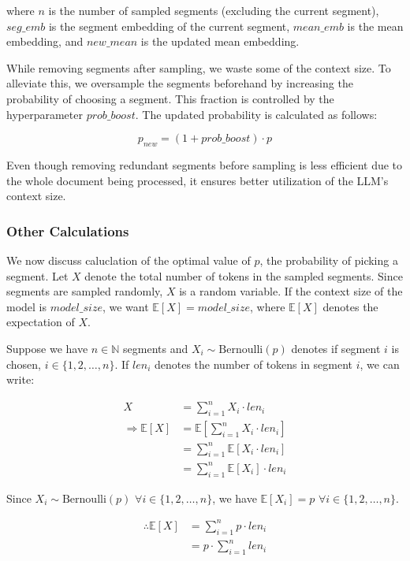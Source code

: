 \noindent where $n$ is the number of sampled segments (excluding the current segment), $seg\_emb$ is the segment embedding of the current segment, $mean\_emb$ is the mean embedding, and $new\_mean$ is the updated mean embedding.

While removing segments after sampling, we waste some of the context size.
To alleviate this, we oversample the segments beforehand by increasing the probability of choosing a segment.
This fraction is controlled by the hyperparameter $prob\_boost$.
The updated probability is calculated as follows:

\[ p_{new} = (1 + prob\_boost) \cdot p \]

Even though removing redundant segments before sampling is less efficient due to the whole document being processed, it ensures better utilization of the LLM's context size.

\subsubsection*{Other Calculations}

We now discuss caluclation of the optimal value of $p$, the probability of picking a segment.
Let $X$ denote the total number of tokens in the sampled segments.
Since segments are sampled randomly, $X$ is a random variable.
If the context size of the model is $model\_size$, we want $\mathbb{E}[X] = model\_size$, where $\mathbb{E}[X]$ denotes the expectation of $X$.

Suppose we have $n \in \mathbb{N}$ segments and $X_i \sim \mathrm{Bernoulli}(p)$ denotes if segment $i$ is chosen, $i \in \{1, 2, \dots, n\}$.
If $len_i$ denotes the number of tokens in segment $i$, we can write:

\begin{align*}
  X &= \sum_{i = 1}^{n} X_i \cdot len_i \\
  \Rightarrow \mathbb{E}[X] &= \mathbb{E}[\sum_{i = 1}^{n} X_i \cdot len_i] \\
  &= \sum_{i = 1}^{n} \mathbb{E}[X_i \cdot len_i] \\
  &= \sum_{i = 1}^{n} \mathbb{E}[X_i] \cdot len_i
\end{align*}

Since $X_i \sim \mathrm{Bernoulli}(p)$ $\forall i \in \{1, 2, \dots, n\}$, we have $\mathbb{E}[X_i] = p$ $\forall i \in \{1, 2, \dots, n\}$.

\begin{align*}
  \therefore \mathbb{E}[X] &= \sum_{i = 1}^{n} p \cdot len_i \\
  &= p \cdot \sum_{i = 1}^{n} len_i
\end{align*}

